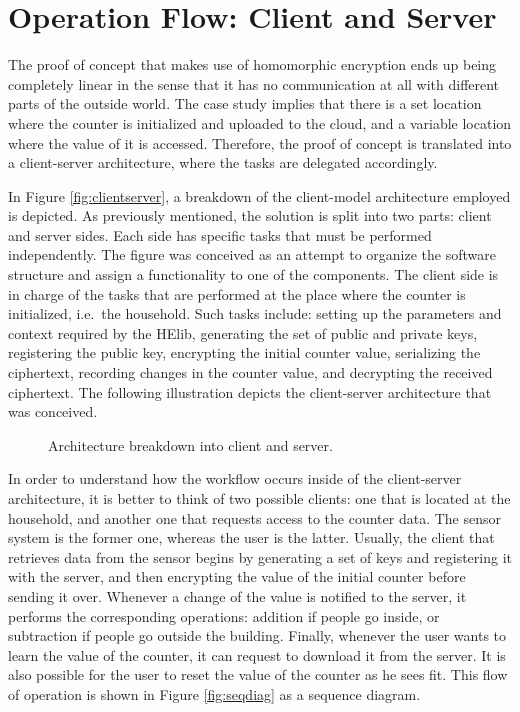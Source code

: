 \section{{Operation Flow: Client and Server}}

The proof of concept that makes use of homomorphic encryption ends up being completely linear in the sense that it has no communication at all with different parts of the outside world. The case study implies that there is a set location where the counter is initialized and uploaded to the cloud, and a variable location where the value of it is accessed. Therefore, the proof of concept is translated into a client-server architecture, where the tasks are delegated accordingly. 

In Figure \ref{fig:clientserver}, a breakdown of the client-model architecture employed is depicted. As previously mentioned, the solution is split into two parts: client and server sides. Each side has specific tasks that must be performed independently. The figure was conceived as an attempt to organize the software structure and assign a functionality to one of the components. The client side is in charge of the tasks that are performed at the place where the counter is initialized, i.e.\ the household. Such tasks include: setting up the parameters and context required by the HElib, generating the set of public and private keys, registering the public key, encrypting the initial counter value, serializing the ciphertext, recording changes in the counter value, and decrypting the received ciphertext. The following illustration depicts the client-server architecture that was conceived. 
\begin{figure}[H]

\caption{Architecture breakdown into client and server.}
\end{figure}



In order to understand how the workflow occurs inside of the client-server architecture, it is better to think of two possible clients: one that is located at the household, and another one that requests access to the counter data. The sensor system is the former one, whereas the user is the latter. Usually, the client that retrieves data from the sensor begins by generating a set of keys and registering it with the server, and then encrypting the value of the initial counter before sending it over. Whenever a change of the value is notified to the server, it performs the corresponding operations: addition if people go inside, or subtraction if people go outside the building. Finally, whenever the user wants to learn the value of the counter, it can request to download it from the server. It is also possible for the user to reset the value of the counter as he sees fit. This flow of operation is shown in Figure \ref{fig:seqdiag} as a sequence diagram.

